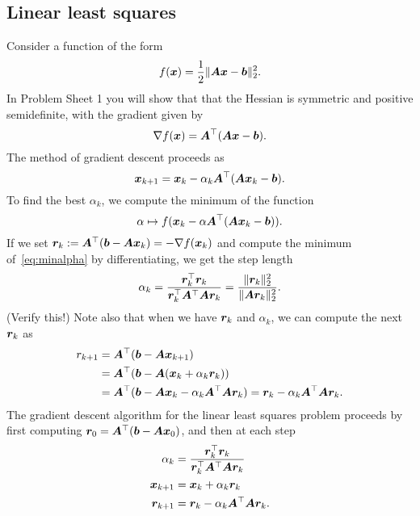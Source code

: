\subsection{Linear least squares} Consider a function of the form
\begin{equation*}
 f(\bm{x}) = \frac{1}{2}\Vert {\bm{A}\bm{x}-\bm{b}}\Vert_2^2.
\end{equation*}
In Problem Sheet 1 you will show that that the Hessian is symmetric and positive semidefinite, with the gradient given by
\begin{equation*}
 \nabla f(\bm{x}) = \bm{A}^{\top}(\bm{A}\bm{x}-\bm{b}).
\end{equation*}
The method of gradient descent proceeds as
\begin{equation*}
 \bm{x}_{k+1} = \bm{x}_k-\alpha_k \bm{A}^{\top}(\bm{A}\bm{x}_k-\bm{b}).
\end{equation*}
To find the best $\alpha_k$, we compute the minimum of the function
\begin{equation}\label{eq:minalpha}
 \alpha \mapsto f(\bm{x}_k-\alpha \bm{A}^{\top}(\bm{A}\bm{x}_k-\bm{b})).
\end{equation}
If we set $\bm{r}_k:=\bm{A}^{\top}(\bm{b}-\bm{A}\bm{x}_k) = -\nabla f(\bm{x}_k)$ and compute the minimum of~\eqref{eq:minalpha} by differentiating, we get the step length
\begin{equation*}
 \alpha_k = \frac{\bm{r}_k^{\top}\bm{r}_k}{\bm{r}_k^{\top}\bm{A}^\top\bm{A}\bm{r}_k} = \frac{\Vert {\bm{r}_k}\Vert_2^2}{\Vert {\bm{A}\bm{r}_k}\Vert_2^2}.
\end{equation*}
(Verify this!) Note also that when we have $\bm{r}_k$ and $\alpha_k$, we can compute the next $\bm{r}_k$ as
\begin{align*}
 r_{k+1} &= \bm{A}^{\top}(\bm{b}-\bm{A}\bm{x}_{k+1})\\
         &= \bm{A}^{\top}(\bm{b}-\bm{A}(\bm{x}_{k}+\alpha_k \bm{r}_k))\\
         &= \bm{A}^{\top}(\bm{b}-\bm{A}\bm{x}_k - \alpha_k \bm{A}^{\top}\bm{A}\bm{r}_k) = \bm{r}_k - \alpha_k \bm{A}^{\top}\bm{A}\bm{r}_k.
\end{align*}
The gradient descent algorithm for the linear least squares problem proceeds by first computing $\bm{r}_0=\bm{A}^{\top}(\bm{b}-\bm{A}\bm{x}_0)$, and then at each step
\begin{align*}
 \alpha_k &= \frac{\bm{r}_k^{\top}\bm{r}_k}{\bm{r}_k^{\top}\bm{A}^\top\bm{A}\bm{r}_k}\\
 \bm{x}_{k+1} &= \bm{x}_k+\alpha_k \bm{r}_k\\
 \bm{r}_{k+1} &= \bm{r}_k - \alpha_{k}\bm{A}^{\top}\bm{A}\bm{r}_k.
\end{align*}
